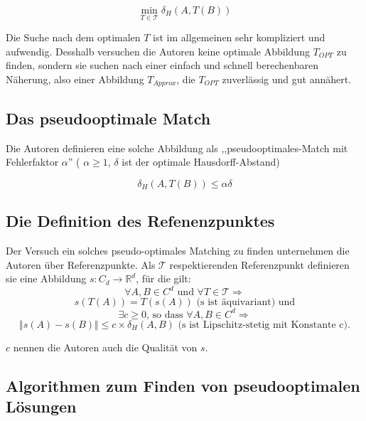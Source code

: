 $$\min_{T\in\mathcal{T}}\delta_H(A,T(B))$$

Die Suche nach dem optimalen $T$ ist im allgemeinen sehr kompliziert und aufwendig. Desshalb versuchen die Autoren keine optimale Abbildung $T_{OPT}$ zu finden, sondern sie suchen nach einer einfach und schnell berechenbaren Näherung, also einer Abbildung $T_{Approx}$, die $T_{OPT}$ zuverlässig und gut annähert.

\subsection{Das pseudooptimale Match}

Die Autoren definieren eine solche Abbildung als ,,pseudooptimales-Match mit Fehlerfaktor $\alpha$'' ( $\alpha\geq 1$, $\delta$ ist der optimale Hausdorff-Abstand)

$$\delta_H(A,T(B))\leq \alpha \delta$$

\subsection{Die Definition des Refenenzpunktes}

Der Versuch ein solches pseudo-optimales Matching zu finden unternehmen die Autoren über Referenzpunkte. Als $\mathcal{T}$ respektierenden Referenzpunkt definieren sie eine Abbildung $s:C_d\longrightarrow\mathbb{R}^d$, für die gilt:
$$\forall A, B\in C^d \text{ und } \forall T\in\mathcal{T}\Rightarrow$$
$$s(T(A))=T(s(A))\text{ (s ist äquivariant) und}$$
$$\exists c\geq0 \text{, so dass } \forall A, B \in C^d\Rightarrow$$
$$\Vert s(A)-s(B)\Vert\leq c\times\delta_H(A,B)\text{ (s ist Lipschitz-stetig mit Konstante c)}.$$

$c$ nennen die Autoren auch die Qualität von $s$.

\subsection{Algorithmen zum Finden von pseudooptimalen Lösungen}

